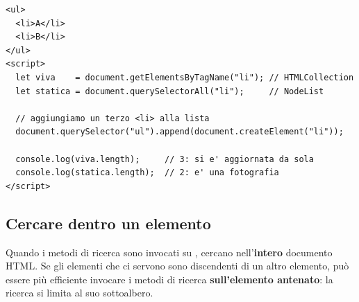 \begin{affianco}[0.58][c]
\codicepiccolo
\begin{lstlisting}[style=html, name=viva-statica.html]
<ul>
  <li>A</li>
  <li>B</li>
</ul>
<script>
  let viva    = document.getElementsByTagName("li"); // HTMLCollection
  let statica = document.querySelectorAll("li");     // NodeList

  // aggiungiamo un terzo <li> alla lista
  document.querySelector("ul").append(document.createElement("li"));

  console.log(viva.length);     // 3: si e' aggiornata da sola
  console.log(statica.length);  // 2: e' una fotografia
</script>
\end{lstlisting}
\risultato
\begin{immagine}
\end{immagine}
\end{affianco}

\subsection{Cercare dentro un elemento}

Quando i metodi di ricerca sono invocati su , cercano
nell'\textbf{intero} documento HTML. Se gli elementi che ci servono sono
discendenti di un altro elemento, può essere più efficiente invocare i metodi di
ricerca \textbf{sull'elemento antenato}: la ricerca si limita al suo
sottoalbero.

